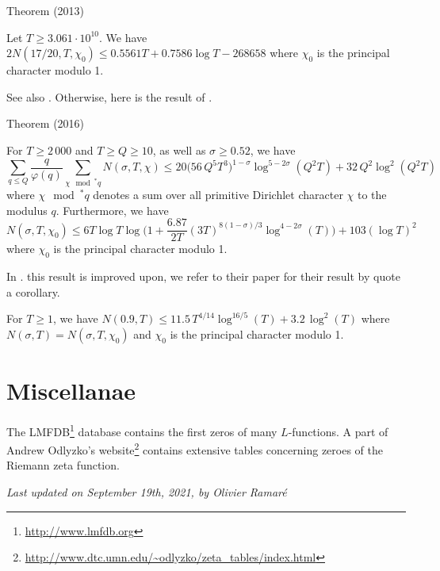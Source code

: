 \par 
\begin{thm}{Theorem (2013)}

  Let $T\ge3.061\cdot10^{10}$. We have
  $
    2N(17/20,T,\chi_0)\le 0.5561T+0.7586\log T-268 658
  $
  where $\chi_0$ is the principal character modulo 1.
\end{thm}


See also
\cite{Kadiri*13}.
Otherwise, here is the result of
\cite{Ramare*13d}.
\par 

\begin{thm}{Theorem (2016)}

  For $T\ge2\,000$ and $T\ge Q\ge10$, as well as $\sigma\ge0.52$, we have 
  $$
    \sum_{q\le Q}\frac{q}{\varphi(q)}
    \sum_{\chi\mod^* q}N(\sigma,T,\chi)
    \le 
    20\bigl(56\,Q^{5}T^3\bigr)^{1-\sigma}\log^{5-2\sigma}(Q^2T)
    +32\,Q^2\log^2(Q^2T)
  $$
  where $\chi\mod^* q$ denotes a sum over all primitive Dirichlet character
  $\chi$ to the modulus $q$. Furthermore, we have
  $$
    N(\sigma,T,\chi_0)\le 6T\log T
    \log\biggl(1+\frac{6.87}{2T}(3T)^{8(1-\sigma)/{3}}\log^{4-2\sigma}(T)\biggr)
    +103(\log T)^2
  $$
  where $\chi_0$ is the principal character modulo 1.
\end{thm}

In
\cite{Kadiri-Lumley-Ng*18}.
this result is improved upon, we refer to their paper for their result
by quote a corollary.


  For $T\ge1$, we have 
  $
    N(0.9,T)
    \le 
    11.5\, T^{4/14}\log^{16/5}(T)
    +3.2\,\log^2(T)
  $
  where $N(\sigma,T)=N(\sigma,T,\chi_0)$ and $\chi_0$ is the principal character modulo 1.


\section{Miscellanae}



The LMFDB\footnote{\url{http://www.lmfdb.org}} database contains the first zeros
of many $L$-functions. A part of Andrew Odlyzko's 
website\footnote{\url{http://www.dtc.umn.edu/~odlyzko/zeta_tables/index.html}}
contains extensive tables concerning zeroes of the Riemann zeta function.




 
 







  
\begin{flushright}\small\sl{}   Last updated on September 19th, 2021, by Olivier Ramar\'e
 \end{flushright}














